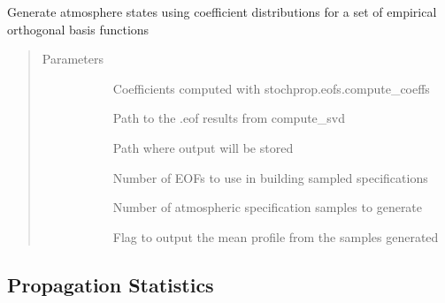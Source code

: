 \documentclass[letterpaper,10pt,english]{sphinxmanual}
\begin{document}
\begin{fulllineitems}
\label{\detokenize{stochprop.eofs:stochprop.eofs.sample_atmo}}
Generate atmosphere states using coefficient distributions for
a set of empirical orthogonal basis functions
\begin{quote}\begin{description}
\item[{Parameters}] \leavevmode\begin{description}
\item[{}] \leavevmode
Coefficients computed with stochprop.eofs.compute\_coeffs

\item[{}] \leavevmode
Path to the .eof results from compute\_svd

\item[{}] \leavevmode
Path where output will be stored

\item[{}] \leavevmode
Number of EOFs to use in building sampled specifications

\item[{}] \leavevmode
Number of atmospheric specification samples to generate

\item[{}] \leavevmode
Flag to output the mean profile from the samples generated

\end{description}

\end{description}\end{quote}

\end{fulllineitems}



\subsection{Propagation Statistics}
\label{\detokenize{stochprop.propagation:module-stochprop.propagation}}\label{\detokenize{stochprop.propagation:propagation-statistics}}\label{\detokenize{stochprop.propagation::doc}}
\end{document}
